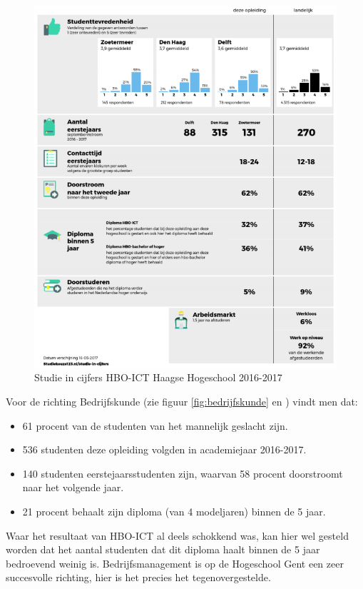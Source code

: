 \begin{figure}
	\includegraphics[width=\textwidth]
	{img/hbo-ict.png}
	\caption{Studie in cijfers HBO-ICT Haagse Hogeschool 2016-2017 \autocite{Studiekeuze2017}}
	\label{fig:hbo-ict}
\end{figure}

Voor de richting Bedrijfskunde (zie figuur \ref{fig:bedrijfskunde} en \textcite{Studiekeuze2017}) vindt men dat:
\begin{itemize}
	\item 61 procent van de studenten van het mannelijk geslacht zijn.
	\item 536 studenten deze opleiding volgden in academiejaar 2016-2017.
	\item 140 studenten eerstejaarsstudenten zijn, waarvan 58 procent doorstroomt naar het volgende jaar.
	\item 21 procent behaalt zijn diploma (van 4 modeljaren) binnen de 5 jaar.
\end{itemize}

Waar het resultaat van HBO-ICT al deels schokkend was, kan hier wel gesteld worden dat het aantal studenten dat dit diploma haalt binnen de 5 jaar bedroevend weinig is. Bedrijfsmanagement is op de Hogeschool Gent een zeer succesvolle richting, hier is het precies het tegenovergestelde.

